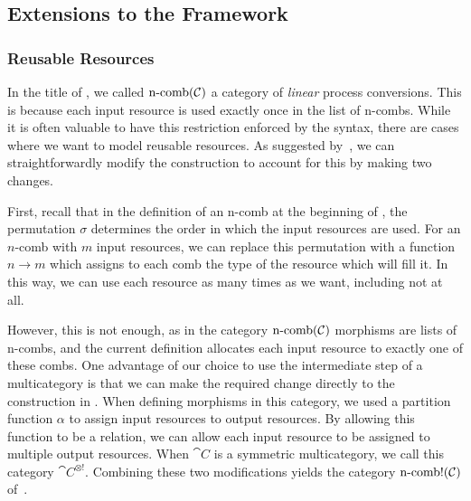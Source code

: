 \subsection{Extensions to the Framework}
\label{sec:extensions}

\subsubsection{Reusable Resources}
In the title of
,
we called $\operatorname*{n-comb}({\mathcal{C}})$ a category of \emph{linear} process conversions.
This is because each input resource is used exactly once in the list of n-combs.
While it is often valuable to have this restriction enforced by the syntax,
there are cases where we want to model reusable resources. As suggested
by~\cite{broadbent-karvonen-2022}, we can straightforwardly modify the
construction to account for this by making two changes.

First, recall that in the definition of an n-comb at the beginning of
,
the permutation $\sigma$ determines the order in which the input resources are
used. For an $n$-comb with $m$ input resources, we can replace this permutation
with a function $n\to m$ which assigns to each comb the type of the resource
which will fill it. In this way, we can use each resource as many times
as we want, including not at all.

However, this is not enough, as in the category $\operatorname*{n-comb}({\mathcal{C}})$ morphisms are
lists of n-combs, and the current definition allocates each input resource to
exactly one of these combs. One advantage of our choice to use the intermediate
step of a multicategory is that we can make the required change directly to the
construction in . When
defining morphisms in this category, we used a partition function $\alpha$ to
assign input resources to output resources. By allowing this function to be a
relation, we can allow each input resource to be assigned to multiple output
resources. When $\cat{C}$ is a symmetric multicategory, we call this category
$\cat{C}^{\otimes!}$. Combining these two modifications yields the category
$\operatorname*{n-comb!}({\mathcal{C}})$ of~\cite{broadbent-karvonen-2022}.

